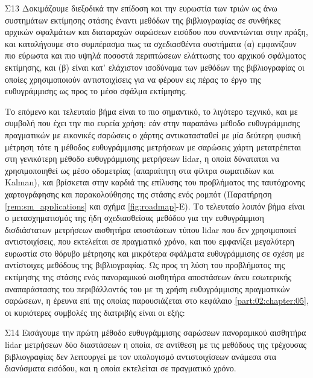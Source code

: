 \begin{bw_box}
\begin{customcontribution}{Σ13}
  \label{contribution:13}
  Δοκιμάζουμε διεξοδικά την επίδοση και την ευρωστία των τριών ως άνω
  συστημάτων εκτίμησης στάσης έναντι μεθόδων της βιβλιογραφίας σε συνθήκες
  αρχικών σφαλμάτων και διαταραχών σαρώσεων εισόδου που συναντώνται στην πράξη,
  και καταλήγουμε στο συμπέρασμα πως τα σχεδιασθέντα συστήματα (α) εμφανίζουν
  πιο εύρωστα και πιο υψηλά ποσοστά περιπτώσεων ελάττωσης του αρχικού σφάλματος
  εκτίμησης, και (β) είναι κατ' ελάχιστον ισοδύναμα των μεθόδων της
  βιβλιογραφίας οι οποίες χρησιμοποιούν αντιστοιχίσεις για να φέρουν εις πέρας
  το έργο της ευθυγράμμισης ως προς το μέσο σφάλμα εκτίμησης.
\end{customcontribution}
\end{bw_box}
\vspace{1cm}



Το επόμενο και τελευταίο βήμα είναι το πιο σημαντικό, το λιγότερο τεχνικό, και
με συμβολή που έχει την πιο ευρεία χρήση: εάν στην παραπάνω μέθοδο
ευθυγράμμισης πραγματικών με εικονικές σαρώσεις ο χάρτης αντικατασταθεί με μία
δεύτερη φυσική μέτρηση τότε η μέθοδος ευθυγράμμισης μετρήσεων με σαρώσεις χάρτη
μετατρέπεται στη γενικότερη μέθοδο ευθυγράμμισης μετρήσεων lidar, η οποία
δύναταται να χρησιμοποιηθεί ως μέσο οδομετρίας (απαραίτητη στα φίλτρα
σωματιδίων και Kalman), και βρίσκεται στην καρδιά της επίλυσης του προβλήματος
της ταυτόχρονης χαρτογράφησης και παρακολούθησης της στάσης ενός ρομπότ
(Παρατήρηση \ref{rem:sm_applications} και σχήμα \ref{fig:roadmap}-Ε). Το
τελευταίο λοιπόν βήμα είναι ο μετασχηματισμός της ήδη σχεδιασθείσας μεθόδου για
την ευθυγράμμιση δισδιάστατων μετρήσεων αισθητήρα αποστάσεων τύπου lidar που
δεν χρησιμοποιεί αντιστοιχίσεις, που εκτελείται σε πραγματικό χρόνο, και που
εμφανίζει μεγαλύτερη ευρωστία στο θόρυβο μέτρησης και μικρότερα σφάλματα
ευθυγράμμισης σε σχέση με αντίστοιχες μεθόδους της βιβλιογραφίας. Ως προς τη
λύση του προβλήματος της εκτίμησης της στάσης ενός πανοραμικού αισθητήρα
αποστάσεων άνευ εσωτερικής αναπαράστασης του περιβάλλοντός του με τη χρήση
ευθυγράμμισης πραγματικών σαρώσεων, η έρευνα επί της οποίας παρουσιάζεται στο
κεφάλαιο \ref{part:02:chapter:05}, οι κυριότερες συμβολές της διατριβής είναι
οι εξής:

\begin{bw_box}
\begin{customcontribution}{Σ14}
  \label{contribution:14}
  Εισάγουμε την πρώτη μέθοδο ευθυγράμμισης σαρώσεων πανοραμικού αισθητήρα
  lidar μετρήσεων δύο διαστάσεων η οποία, σε αντίθεση με τις μεθόδους της
  τρέχουσας βιβλιογραφίας δεν λειτουργεί με τον υπολογισμό αντιστοιχίσεων
  ανάμεσα στα διανύσματα εισόδου, και η οποία εκτελείται σε πραγματικό χρόνο.
\end{customcontribution}
\end{bw_box}

